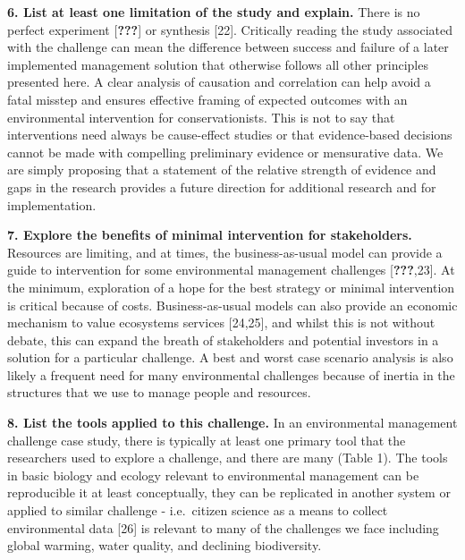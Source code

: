 \documentclass[10pt,letterpaper]{article}
\begin{document}
\textbf{6. List at least one limitation of the study and explain.} There
is no perfect experiment {[}{\textbf{???}}{]} or synthesis {[}22{]}.
Critically reading the study associated with the challenge can mean the
difference between success and failure of a later implemented management
solution that otherwise follows all other principles presented here. A
clear analysis of causation and correlation can help avoid a fatal
misstep and ensures effective framing of expected outcomes with an
environmental intervention for conservationists. This is not to say that
interventions need always be cause-effect studies or that evidence-based
decisions cannot be made with compelling preliminary evidence or
mensurative data. We are simply proposing that a statement of the
relative strength of evidence and gaps in the research provides a future
direction for additional research and for implementation.

\textbf{7. Explore the benefits of minimal intervention for
stakeholders.} Resources are limiting, and at times, the
business-as-usual model can provide a guide to intervention for some
environmental management challenges {[}{\textbf{???}},23{]}. At the
minimum, exploration of a hope for the best strategy or minimal
intervention is critical because of costs. Business-as-usual models can
also provide an economic mechanism to value ecosystems services
{[}24,25{]}, and whilst this is not without debate, this can expand the
breath of stakeholders and potential investors in a solution for a
particular challenge. A best and worst case scenario analysis is also
likely a frequent need for many environmental challenges because of
inertia in the structures that we use to manage people and resources.

\textbf{8. List the tools applied to this challenge.} In an
environmental management challenge case study, there is typically at
least one primary tool that the researchers used to explore a challenge,
and there are many (Table 1). The tools in basic biology and ecology
relevant to environmental management can be reproducible it at least
conceptually, they can be replicated in another system or applied to
similar challenge - i.e.~citizen science as a means to collect
environmental data {[}26{]} is relevant to many of the challenges we
face including global warming, water quality, and declining
biodiversity.
\end{document}
